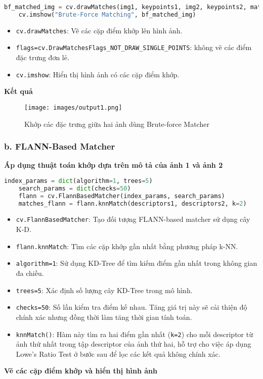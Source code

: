 \begin{lstlisting}[language=Python]
	bf_matched_img = cv.drawMatches(img1, keypoints1, img2, keypoints2, matches_bf[:50], None, flags=cv.DrawMatchesFlags_NOT_DRAW_SINGLE_POINTS)
	cv.imshow("Brute-Force Matching", bf_matched_img)
\end{lstlisting}

\begin{itemize}
	\item \texttt{cv.drawMatches}: Vẽ các cặp điểm khớp lên hình ảnh.
	\item \texttt{flags=cv.DrawMatchesFlags\_NOT\_DRAW\_SINGLE\_POINTS}: không vẽ các điểm đặc trưng đơn lẻ.
	\item \texttt{cv.imshow}: Hiển thị hình ảnh có các cặp điểm khớp.
\end{itemize}
\textbf{Kết quả}
\begin{figure}[H]
	\centering
	\texttt{[image: images/output1.png]}
	\caption{Khớp các đặc trưng giữa hai ảnh dùng Brute-force Matcher}
\end{figure}

\subsubsection*{b. FLANN-Based Matcher}

\textbf{Áp dụng thuật toán khớp dựa trên mô tả của ảnh 1 và ảnh 2}

\begin{lstlisting}[language=Python]
	index_params = dict(algorithm=1, trees=5)
	search_params = dict(checks=50)
	flann = cv.FlannBasedMatcher(index_params, search_params)
	matches_flann = flann.knnMatch(descriptors1, descriptors2, k=2)
\end{lstlisting}

\begin{itemize}
	\item \texttt{cv.FlannBasedMatcher}: Tạo đối tượng FLANN-based matcher sử dụng cây K-D.
	\item \texttt{flann.knnMatch}: Tìm các cặp khớp gần nhất bằng phương pháp k-NN.
    \item \texttt{algorithm=1}: Sử dụng KD-Tree để tìm kiếm điểm gần nhất trong không gian đa chiều.
	\item \texttt{trees=5}: Xác định số lượng cây KD-Tree trong mô hình.
	\item \texttt{checks=50}: Số lần kiểm tra điểm kế nhau. Tăng giá trị này sẽ cải thiện độ chính xác nhưng đồng thời làm tăng thời gian tính toán.
	\item \texttt{knnMatch()}: Hàm này tìm ra hai điểm gần nhất (\texttt{k=2}) cho mỗi descriptor từ ảnh thứ nhất trong tập descriptor của ảnh thứ hai, hỗ trợ cho việc áp dụng Lowe's Ratio Test ở bước sau để lọc các kết quả không chính xác.
\end{itemize}
\textbf{Vẽ các cặp điểm khớp và hiển thị hình ảnh}

